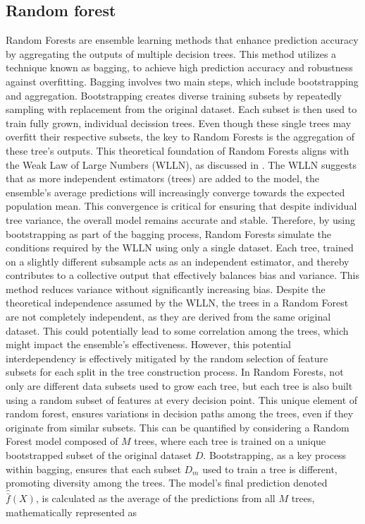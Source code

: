 \documentclass[12pt]{article}
\begin{document}
\subsection{Random forest}
Random Forests are ensemble learning methods that enhance prediction accuracy by aggregating the outputs of multiple decision trees. This method utilizes a technique known as bagging, to achieve high prediction accuracy and robustness against overfitting.
Bagging involves two main steps, which include bootstrapping and aggregation.
Bootstrapping creates diverse training subsets by repeatedly sampling with replacement from the original dataset. Each subset is then used to train fully grown, individual decission trees. Even though these single trees may overfitt their respective subsets, the key to Random Forests is the aggregation of these tree's outputs. 
This theoretical foundation of Random Forests aligns with the Weak Law of Large Numbers (WLLN), as discussed in \citet[Section~6]{IBE2014185}. The WLLN suggests that as more independent estimators (trees) are added to the model, the ensemble's average predictions will increasingly converge towards the expected population mean. This convergence is critical for ensuring that despite individual tree variance, the overall model remains accurate and stable. Therefore, by using bootstrapping as part of the bagging process, Random Forests simulate the conditions required by the WLLN using only a single dataset. Each tree, trained on a slightly different subsample acts as an independent estimator, and thereby contributes to a collective output that effectively balances bias and variance. 
This method reduces variance without significantly increasing bias.
Despite the theoretical independence assumed by the WLLN, the trees in a Random Forest are not completely independent, as they are derived from the same original dataset. This could potentially lead to some correlation among the trees, which might impact the ensemble's effectiveness.
However, this potential interdependency is effectively mitigated by the random selection of feature subsets for each split in the tree construction process. In Random Forests, not only are different data subsets used to grow each tree, but each tree is also built using a random subset of features at every decision point. 
 This unique element of random forest, ensures variations in decision paths among the trees, even if they originate from similar subsets.
 This can be quantified by considering a Random Forest model composed of $M$ trees, where each tree is trained on a unique bootstrapped subset of the original dataset $D$. Bootstrapping, as a key process within bagging, ensures that each subset $D_m$ used to train a tree is different, promoting diversity among the trees. The model's final prediction denoted $\hat{\bar{f}}(X)$, is calculated as the average of the predictions from all $M$ trees, mathematically represented as
\end{document}
